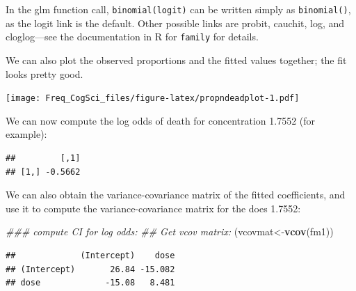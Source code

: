 \documentclass[12pt,]{krantz}
\newenvironment{Shaded}{\begin{snugshade}}{\end{snugshade}}
\newcommand{\CommentTok}[1]{\textcolor[rgb]{0.56,0.35,0.01}{\textit{#1}}}
\newcommand{\DataTypeTok}[1]{\textcolor[rgb]{0.13,0.29,0.53}{#1}}
\newcommand{\DecValTok}[1]{\textcolor[rgb]{0.00,0.00,0.81}{#1}}
\newcommand{\FloatTok}[1]{\textcolor[rgb]{0.00,0.00,0.81}{#1}}
\newcommand{\KeywordTok}[1]{\textcolor[rgb]{0.13,0.29,0.53}{\textbf{#1}}}
\newcommand{\NormalTok}[1]{#1}
\newcommand{\OperatorTok}[1]{\textcolor[rgb]{0.81,0.36,0.00}{\textbf{#1}}}
\begin{document}
In the glm function call, \texttt{binomial(logit)} can be written simply as \texttt{binomial()}, as the logit link is the default. Other possible links are probit, cauchit, log, and cloglog---see the documentation in R for \texttt{family} for details.

We can also plot the observed proportions and the fitted values together; the fit looks pretty good.

\begin{Shaded}
\end{Shaded}

\texttt{[image: Freq\_CogSci\_files/figure-latex/propndeadplot-1.pdf]}

We can now compute the log odds of death for concentration 1.7552 (for example):

\begin{Shaded}
\end{Shaded}

\begin{verbatim}
##         [,1]
## [1,] -0.5662
\end{verbatim}

We can also obtain the variance-covariance matrix of the fitted coefficients, and use it to compute the variance-covariance matrix for the does 1.7552:

\begin{Shaded}
\begin{Highlighting}[]
\CommentTok{### compute CI for log odds:}
\CommentTok{## Get vcov matrix:}
\NormalTok{(vcovmat<-}\KeywordTok{vcov}\NormalTok{(fm1))}
\end{Highlighting}
\end{Shaded}

\begin{verbatim}
##             (Intercept)    dose
## (Intercept)       26.84 -15.082
## dose             -15.08   8.481
\end{verbatim}
\end{document}
